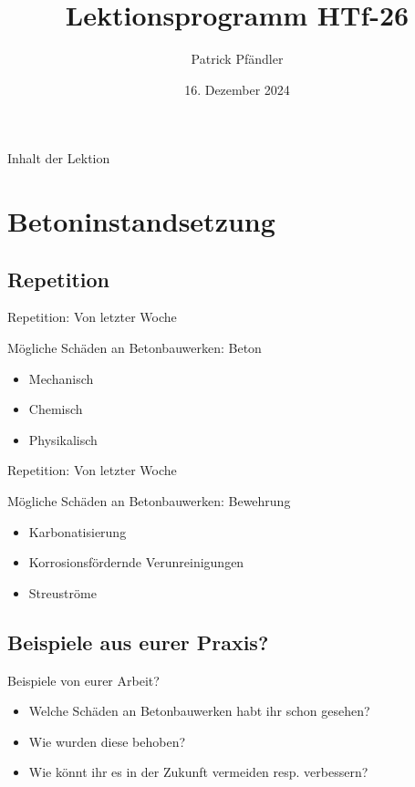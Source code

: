 \def\customoptions{aspectratio=169} %

\title{\textbf{Lektionsprogramm HTf-26}}
\author{Patrick Pfändler}
\date{16. Dezember 2024}




\frame{\titlepage}

\begin{frame}{Inhalt der Lektion}
	\tableofcontents
\end{frame}


\section{Betoninstandsetzung}
\subsection{Repetition}
\begin{frame}{Repetition: Von letzter Woche}
	\begin{block}{Mögliche Schäden an Betonbauwerken: Beton}
		\begin{itemize}
			\item[\textbullet] Mechanisch
			\item[\textbullet] Chemisch
			\item[\textbullet] Physikalisch
		\end{itemize}
	\end{block}
\end{frame}
\begin{frame}{Repetition: Von letzter Woche}
	\begin{block}{Mögliche Schäden an Betonbauwerken: Bewehrung}
		\begin{itemize}
			\item[\textbullet] Karbonatisierung
			\item[\textbullet] Korrosionsfördernde Verunreinigungen
			\item[\textbullet] Streuströme
		\end{itemize}
	\end{block}
\end{frame}

\subsection{Beispiele aus eurer Praxis?}
\begin{frame}{Beispiele von eurer Arbeit?}
	\begin{block}{}
		\begin{itemize}
			\item[\textbullet] Welche Schäden an Betonbauwerken habt ihr schon gesehen?
			\item[\textbullet] Wie wurden diese behoben?
			\item[\textbullet] Wie könnt ihr es in der Zukunft vermeiden resp. verbessern?
		\end{itemize}
	\end{block}
\end{frame}


